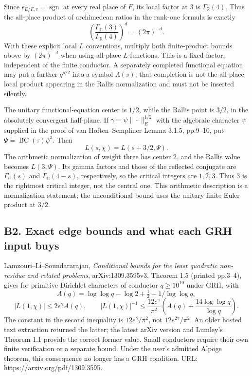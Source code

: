 \documentclass[11pt,a4paper]{article}
\theoremstyle{definition}
\begin{document}
Since \(\epsilon_{E/F,v}=\operatorname{sgn}\) at every real place of \(F\), its local factor at \(3\) is \(\Gamma_{\mathbb R}(4)\). Thus the all-place product of archimedean ratios in the rank-one formula is exactly \[
 \left(\frac{\Gamma_{\mathbb C}(3)}{\Gamma_{\mathbb R}(4)}\right)^d
 =(2\pi)^{-d}.
\tag{B1a.2}
\] With these explicit local \(L\) conventions, multiply both finite-product bounds above by \((2\pi)^{-d}\) when using all-place \(L\)-functions. This is a fixed factor, independent of the finite conductor. A separately completed functional equation may put a further \(q^{s/2}\) into a symbol \(\Lambda(s)\); that completion is not the all-place local product appearing in the Rallis normalization and must not be inserted silently.

The unitary functional-equation center is \(1/2\), while the Rallis point is \(3/2\), in the absolutely convergent half-plane. If \(\gamma=\psi\|\cdot\|_E^{1/2}\) with the algebraic character \(\psi\) supplied in the proof of van Hoften--Sempliner Lemma 3.1.5, pp.9--10, put \(\Psi=\operatorname{BC}(\tau)\psi^3\). Then \[
 L(s,\chi)=L(s+3/2,\Psi).
\] The arithmetic normalization of weight three has center \(2\), and the Rallis value becomes \(L(3,\Psi)\). Its gamma factors and those of the reflected conjugate are \(\Gamma_{\mathbb C}(s)\) and \(\Gamma_{\mathbb C}(4-s)\), respectively, so the critical integers are \(1,2,3\). Thus \(3\) is the rightmost critical integer, not the central one. This arithmetic description is a normalization statement; the unconditional bound uses the unitary finite Euler product at \(3/2\).

\subsection{B2. Exact edge bounds and what each GRH input buys}\label{b2.-exact-edge-bounds-and-what-each-grh-input-buys}

Lamzouri--Li--Soundararajan, \emph{Conditional bounds for the least quadratic non-residue and related problems}, arXiv:1309.3595v3, Theorem 1.5 (printed pp.3--4), gives for primitive Dirichlet characters of conductor \(q\geq10^{10}\) under GRH, with \[
 A(q)=\log\log q-\log2+\tfrac12+1/\log\log q,
\] \[
 |L(1,\chi)|\leq 2e^\gamma A(q),\qquad
 |L(1,\chi)|^{-1}\leq\frac{12e^\gamma}{\pi^2}
 \left(A(q)+\frac{14\log\log q}{\log q}\right).
\] The constant in the second inequality is \(12e^\gamma/\pi^2\), not \(12e^{2\gamma}/\pi^2\). An older hosted text extraction returned the latter; the latest arXiv version and Lumley's Theorem 1.1 provide the correct former value. Small conductors require their own finite verification or a separate bound. Under the user's admitted Alpöge theorem, this consequence no longer has a GRH condition. URL: https://arxiv.org/pdf/1309.3595.
\end{document}
